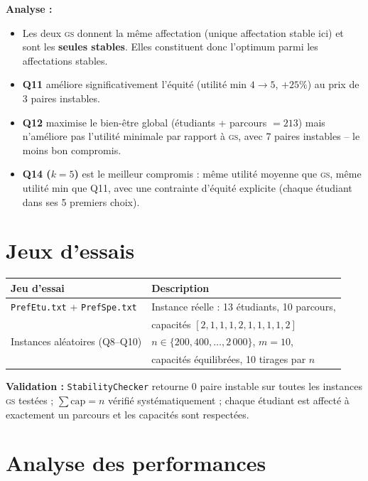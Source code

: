 \documentclass[11pt,a4paper]{article}
\newcommand{\GS}{\textsc{gs}}
\begin{document}
\textbf{Analyse :}
\begin{itemize}
  \item Les deux \GS{} donnent la même affectation (unique affectation stable ici) et sont les \textbf{seules stables}. Elles constituent donc l'optimum parmi les affectations stables.
  \item \textbf{Q11} améliore significativement l'équité (utilité min $4 \to 5$, $+25\%$) au prix de 3 paires instables.
  \item \textbf{Q12} maximise le bien-être global (étudiants + parcours $= 213$) mais n'améliore pas l'utilité minimale par rapport à \GS, avec 7 paires instables -- le moins bon compromis.
  \item \textbf{Q14 ($k=5$)} est le meilleur compromis : même utilité moyenne que \GS, même utilité min que Q11, avec une contrainte d'équité explicite (chaque étudiant dans ses 5 premiers choix).
\end{itemize}

\section{Jeux d'essais}

\begin{center}
\begin{tabular}{ll}
\toprule
\textbf{Jeu d'essai} & \textbf{Description} \\
\midrule
\texttt{PrefEtu.txt} + \texttt{PrefSpe.txt} & Instance réelle : 13 étudiants, 10 parcours, \\
 & capacités $[2,1,1,1,2,1,1,1,1,2]$ \\
Instances aléatoires (Q8--Q10) & $n \in \{200, 400, \ldots, 2\,000\}$, $m = 10$, \\
 & capacités équilibrées, 10 tirages par $n$ \\
\bottomrule
\end{tabular}
\end{center}

\textbf{Validation :} \texttt{StabilityChecker} retourne 0 paire instable sur toutes les instances \GS{} testées ; $\sum \mathrm{cap} = n$ vérifié systématiquement ; chaque étudiant est affecté à exactement un parcours et les capacités sont respectées.

\section{Analyse des performances}
\end{document}
